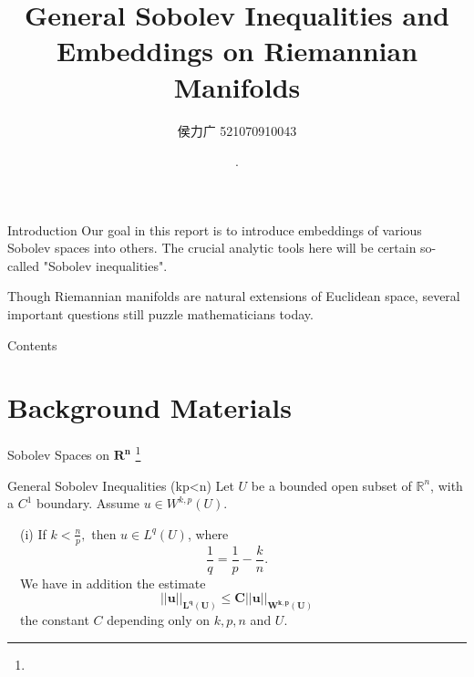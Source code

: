 \documentclass[xcolor=table,dvipsnames,svgnames,aspectratio=169,fontset=windows]{ctexbeamer}
\author{侯力广  521070910043}
\date{\the\year \,.\the\month \,}
\title[流形上的Soblev不等式与嵌入]
{\textbf{General Sobolev Inequalities and \\Embeddings on Riemannian Manifolds}}
\begin{document}
\maketitle

\begin{frame}{Introduction}
  Our goal in this report is to introduce embeddings of various Sobolev spaces into others. The crucial analytic tools here will be certain so-called "Sobolev inequalities". 

  \vskip 12pt
  Though Riemannian manifolds are natural extensions of Euclidean space, several important questions still puzzle mathematicians today.
\end{frame}


\begin{frame}{Contents}
  \tableofcontents[hideallsubsections]
\end{frame}


\section{Background Materials}

\begin{frame}{Sobolev Spaces on $\mathbf{R^n}$  \footnote{}}
\begin{alertblock}{General Sobolev Inequalities (kp<n)}
  Let $U$ be a bounded open subset of $\mathbb{R}^n$, with a $C^1$ boundary. Assume $u \in W^{k, p}(U)$.
  
  \vskip 5pt
  ~~(i) If $k<\frac{n}{p}, $
  then $u \in L^q(U)$, where
  $$
  \frac{1}{q}=\frac{1}{p}-\frac{k}{n} .
  $$
  ~~We have in addition the estimate
  $$
  \bm
  {||u||_{L^q(U)} \leq C||u||_{W^{k, p}(U)}}
  $$
  ~~the constant $C$ depending only on $k, p, n$ and $U$.
\end{alertblock}
\end{frame}
\end{document}

